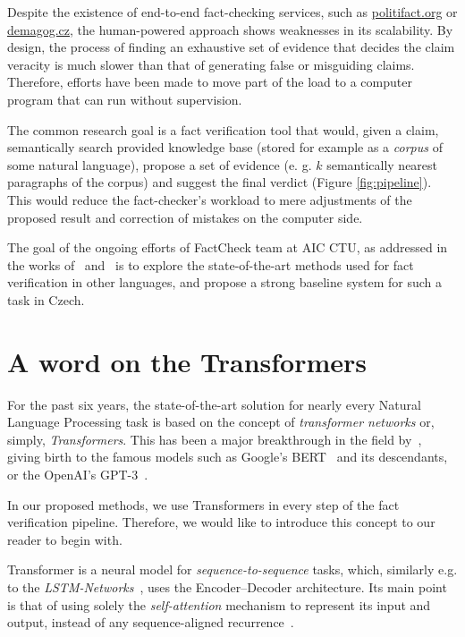 Despite the existence of end-to-end fact-checking services, such as \url{politifact.org} or \url{demagog.cz}, the human-powered approach shows weaknesses in its scalability. By design, the process of finding an exhaustive set of evidence that decides the claim veracity is much slower than that of generating false or misguiding claims. Therefore, efforts have been made to move part of the load to a computer program that can run without supervision.

The common research goal is a fact verification tool that would, given a claim, semantically search provided knowledge base (stored for example as a \textit{corpus} of some natural language), propose a set of evidence (e. g. $k$ semantically nearest paragraphs of the corpus) and suggest the final verdict (Figure \ref{fig:pipeline}). This would reduce the fact-checker's workload to mere adjustments of the proposed result and correction of mistakes on the computer side. 

The goal of the ongoing efforts of {\textsf{FactCheck}} team at {\textsf{AIC CTU}}, as addressed in the works of~\cite{rypar,dedkova} and~\cite{gazo}  is to explore the state-of-the-art methods used for fact verification in other languages, and propose a strong baseline system for such a task in Czech.


\section{A word on the Transformers}
\label{sec:transformers}
For the past six years, the state-of-the-art solution for nearly every Natural Language Processing task is based on the concept of \textit{transformer networks} or, simply, \textit{Transformers}. This has been a major breakthrough in the field by~\cite{vaswani}, giving birth to the famous models such as \textsf{Google}'s \textsf{BERT}~\cite{bert} and its descendants, or the \textsf{OpenAI}'s \textsf{GPT-3}~\cite{gpt3}.

In our proposed methods, we use Transformers in every step of the fact verification pipeline. Therefore, we would like to introduce this concept to our reader to begin with. 

Transformer is a neural model for \textit{sequence-to-sequence} tasks, which, similarly e.g. to the \textit{LSTM-Networks}~\cite{lstm}, uses the Encoder--Decoder architecture. Its main point is that of using solely the \textit{self-attention} mechanism to represent its input and output, instead of any sequence-aligned recurrence~\cite{vaswani}.

